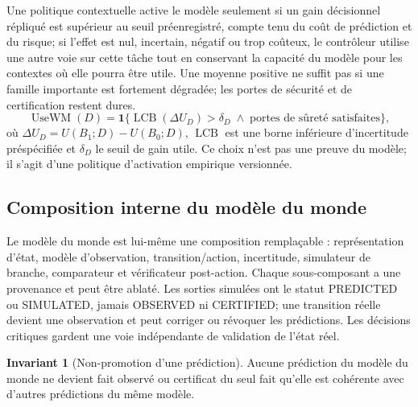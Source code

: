 \documentclass[11pt,a4paper]{article}
\newcommand{\kw}[1]{\textsf{#1}}
\theoremstyle{definition}
\newtheorem{invariant}[definition]{Invariant}
\theoremstyle{plain}
\theoremstyle{remark}
\begin{document}
Une politique contextuelle active le modèle seulement si un gain décisionnel répliqué est supérieur au seuil préenregistré, compte tenu du coût de prédiction et du risque; si l'effet est nul, incertain, négatif ou trop coûteux, le contrôleur utilise une autre voie sur cette tâche tout en conservant la capacité du modèle pour les contextes où elle pourra être utile. Une moyenne positive ne suffit pas si une famille importante est fortement dégradée; les portes de sécurité et de certification restent dures.
\[
\operatorname{UseWM}(D)=\mathbf{1}\{\operatorname{LCB}(\Delta U_D)>\delta_D\;\land\;\text{portes de sûreté satisfaites}\},
\]
où $\Delta U_D=U(B_1;D)-U(B_0;D)$, $\operatorname{LCB}$ est une borne inférieure d'incertitude préspécifiée et $\delta_D$ le seuil de gain utile. Ce choix n'est pas une preuve du modèle; il s'agit d'une politique d'activation empirique versionnée.

\subsection{Composition interne du modèle du monde}
Le modèle du monde est lui-même une composition remplaçable : représentation d'état, modèle d'observation, transition/action, incertitude, simulateur de branche, comparateur et vérificateur post-action. Chaque sous-composant a une provenance et peut être ablaté. Les sorties simulées ont le statut \kw{PREDICTED} ou \kw{SIMULATED}, jamais \kw{OBSERVED} ni \kw{CERTIFIED}; une transition réelle devient une observation et peut corriger ou révoquer les prédictions. Les décisions critiques gardent une voie indépendante de validation de l'état réel.

\begin{invariant}[Non-promotion d'une prédiction]
Aucune prédiction du modèle du monde ne devient fait observé ou certificat du seul fait qu'elle est cohérente avec d'autres prédictions du même modèle.
\end{invariant}
\end{document}
